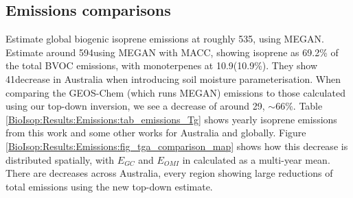       
      
  \subsection{Emissions comparisons}
    \label{BioIsop:Results:Emissions}
    
    \textcite{Guenther2012} Estimate global biogenic isoprene emissions at roughly 535\tgpyr, using MEGAN.
    \textcite{Sindelarova2014} Estimate around 594\tgpyr using MEGAN with MACC, showing isoprene as 69.2\% of the total BVOC emissions, with monoterpenes at 10.9\tgpyr (10.9\%).
    They show 41\tgpyr decrease in Australia when introducing soil moisture parameterisation.
    When comparing the GEOS-Chem (which runs MEGAN) emissions to those calculated using our top-down inversion, we see a decrease of around 29\tgpyr, $\sim 66\%$.
    Table \ref{BioIsop:Results:Emissions:tab_emissions_Tg} shows yearly isoprene emissions from this work and some other works for Australia and globally.
    Figure \ref{BioIsop:Results:Emissions:fig_tga_comparison_map} shows how this decrease is distributed spatially, with $E_{GC}$ and $E_{OMI}$ in \tgpyr calculated as a multi-year mean.
    There are decreases across Australia, every region showing large reductions of total emissions using the new top-down estimate.
    
    
    
    
